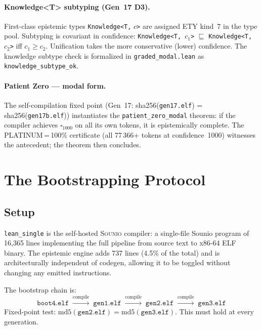 \documentclass[acmsmall,screen,review,anonymous]{acmart}
\newcommand{\sounio}{\textsc{Sounio}\xspace}
\newcommand{\lean}{\texttt{lean\_single}\xspace}
\begin{document}
\paragraph{Knowledge\textless T\textgreater{} subtyping (Gen~17 D3).}
First-class epistemic types \texttt{Knowledge<T,} $c$\texttt{>} are assigned
ETY kind~7 in the type pool.
Subtyping is covariant in confidence:
\texttt{Knowledge<T, $c_1$>} $\sqsubseteq$ \texttt{Knowledge<T, $c_2$>} iff
$c_1 \geq c_2$.
Unification takes the more conservative (lower) confidence.
The knowledge subtype check is formalized in \texttt{graded\_modal.lean} as
\texttt{knowledge\_subtype\_ok}.

\paragraph{Patient Zero --- modal form.}
The self-compilation fixed point (Gen~17: sha256(\texttt{gen17.elf}) =
sha256(\texttt{gen17b.elf})) instantiates the
\texttt{patient\_zero\_modal} theorem:
if the compiler achieves $\square_{1000}$ on all its own tokens, it is
epistemically complete.
The PLATINUM\,=\,100\% certificate (all 77\,366+ tokens at confidence~1000)
witnesses the antecedent; the theorem then concludes.

\section{The Bootstrapping Protocol}
\label{sec:bootstrap}

\subsection{Setup}

\lean is the self-hosted \sounio compiler: a single-file Sounio program
of 16,365 lines implementing the full pipeline from source text to x86-64
ELF binary.
The epistemic engine adds 737 lines (4.5\% of the total) and is
architecturally independent of codegen, allowing it to be toggled without
changing any emitted instructions.

The bootstrap chain is:
\[
\texttt{boot4.elf} \;\xrightarrow{\text{compile}}\; \texttt{gen1.elf}
  \;\xrightarrow{\text{compile}}\; \texttt{gen2.elf}
  \;\xrightarrow{\text{compile}}\; \texttt{gen3.elf}
\]
Fixed-point test: $\mathrm{md5}(\texttt{gen2.elf}) = \mathrm{md5}(\texttt{gen3.elf})$.
This must hold at every generation.
\end{document}
